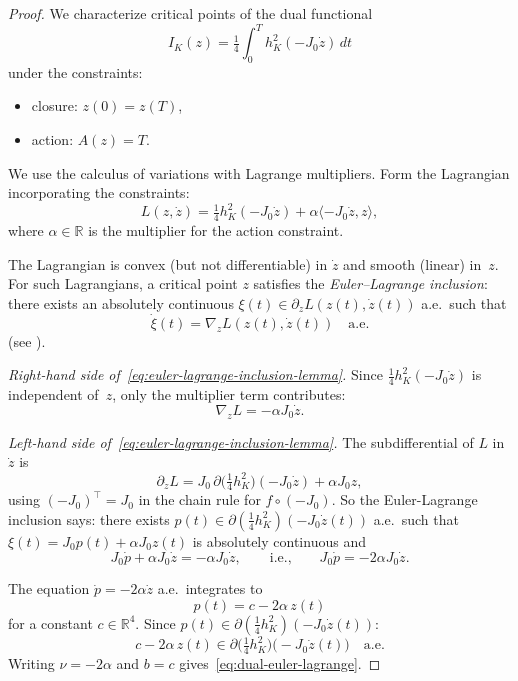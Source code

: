\begin{proof}
We characterize critical points of the dual functional
\[
  I_K(z) = \tfrac{1}{4}\int_0^T h_K^2(-J_0\dot{z}) \, dt
\]
under the constraints:
\begin{itemize}
\item closure: $z(0) = z(T)$,
\item action: $A(z) = T$.
\end{itemize}

We use the calculus of variations with Lagrange multipliers.
Form the Lagrangian incorporating the constraints:
\[
  L(z, \dot{z}) = \tfrac{1}{4}h_K^2(-J_0\dot{z}) + \alpha\langle -J_0\dot{z}, z\rangle,
\]
where $\alpha \in \mathbb{R}$ is the multiplier for the action constraint.

The Lagrangian is convex (but not differentiable) in $\dot{z}$
and smooth (linear) in~$z$.
For such Lagrangians, a critical point $z$ satisfies the
\emph{Euler--Lagrange inclusion}: there exists an absolutely continuous
$\xi(t) \in \partial_{\dot{z}} L(z(t), \dot{z}(t))$ a.e.\ such that
\begin{equation}\label{eq:euler-lagrange-inclusion-lemma}
  \dot{\xi}(t) = \nabla_z L(z(t), \dot{z}(t)) \quad\text{a.e.}
\end{equation}
(see \cite[Ch.~5]{Clarke1983}).

\emph{Right-hand side of~\eqref{eq:euler-lagrange-inclusion-lemma}.}
Since $\tfrac{1}{4}h_K^2(-J_0\dot{z})$ is independent of~$z$,
only the multiplier term contributes:
\[
  \nabla_z L = -\alpha J_0 \dot{z}.
\]

\emph{Left-hand side of~\eqref{eq:euler-lagrange-inclusion-lemma}.}
The subdifferential of $L$ in $\dot{z}$ is
\[
  \partial_{\dot{z}} L
  = J_0\, \partial\bigl(\tfrac{1}{4}h_K^2\bigr)(-J_0\dot{z})
    + \alpha J_0 z,
\]
using $(-J_0)^\top = J_0$ in the chain rule for $f \circ (-J_0)$.
So the Euler-Lagrange inclusion says: there exists $p(t) \in \partial(\tfrac{1}{4}h_K^2)(-J_0\dot{z}(t))$
a.e.\ such that $\xi(t) = J_0 p(t) + \alpha J_0 z(t)$ is absolutely continuous and
\[
  J_0 \dot{p} + \alpha J_0 \dot{z}
  = -\alpha J_0 \dot{z},
  \qquad\text{i.e.,}\qquad
  J_0 \dot{p} = -2\alpha J_0 \dot{z}.
\]

The equation $\dot{p} = -2\alpha \dot{z}$ a.e.\ integrates to
\[
  p(t) = c - 2\alpha\, z(t)
\]
for a constant $c \in \mathbb{R}^4$.
Since $p(t) \in \partial(\tfrac{1}{4}h_K^2)(-J_0\dot{z}(t))$:
\[
  c - 2\alpha\, z(t)
  \in \partial\bigl(\tfrac{1}{4}h_K^2\bigr)\bigl(-J_0\dot{z}(t)\bigr)
  \quad \text{a.e.}
\]
Writing $\nu = -2\alpha$ and $b = c$ gives~\eqref{eq:dual-euler-lagrange}.
\end{proof}

